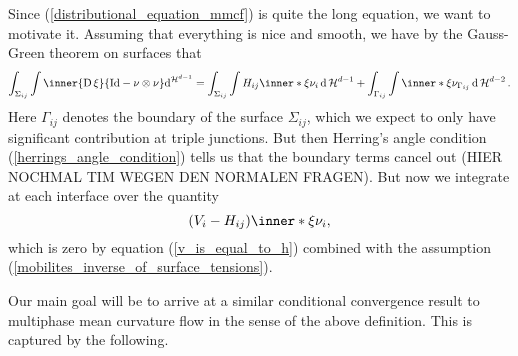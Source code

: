 Since (\ref{distributional_equation_mmcf}) is quite the long equation, we want 
to motivate it. Assuming that everything is nice and smooth, we have by the 
Gauss-Green theorem on surfaces 
\cite[Thm.~11.8]{maggi_sets_of_finite_perimeter} that
\begin{equation*}
	\int_{ \Sigma_{ i j } }
	\int 
	\inner{ \diff \xi }{ \mathrm{Id} - \nu \otimes \nu }
	\dd^{\hm^{ d- 1 }}
	=
	\int_{ \Sigma_{ i j } }
	\int
	H_{ i j } \inner*{ \xi }{ \nu_{ i } }
	\dd{\hm^{ d- 1 }}
	+
	\int_{ \Gamma_{ i j } }
	\int
	\inner*{ \xi }{ \nu_{ \Gamma_{ i j } } }
	\dd{ \hm^{ d - 2 } }.
\end{equation*}
Here $ \Gamma_{ i j } $ denotes the boundary of the surface $ \Sigma_{ i j 
} $, which we expect to only have significant contribution at triple 
junctions. But then Herring's angle condition 
(\ref{herrings_angle_condition}) tells us that the boundary terms cancel 
out (HIER NOCHMAL TIM WEGEN DEN NORMALEN FRAGEN). But now we integrate at 
each interface over the quantity
\begin{equation*}
	(V_{ i } - H_{ i j } ) \inner*{ \xi }{ \nu_{ i } },
\end{equation*}
which is zero by equation (\ref{v_is_equal_to_h}) combined with the 
assumption (\ref{mobilites_inverse_of_surface_tensions}).

Our main goal will be to arrive at a similar conditional convergence result 
to multiphase mean curvature flow in the sense of the above definition. 
This is captured by the following.

